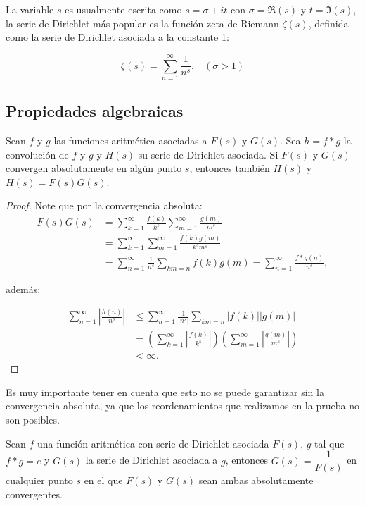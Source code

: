 La variable $s$ es usualmente escrita como $s=\sigma+it$ con $\sigma=\Re(s)$ y $t=\Im(s)$, la serie de Dirichlet más popular es la función zeta de Riemann $\zeta(s)$, definida como la serie de Dirichlet asociada a la constante 1:

$$\zeta(s)=\sum_{n=1}^{\infty} \frac{1}{n^s}.\quad (\sigma>1) $$

\subsection{Propiedades algebraicas}

\begin{theorem}\label{proddirich}
Sean $f$ y $g$ las funciones aritmética asociadas a $F(s)$ y $G(s)$. Sea $h=f*g$ la convolución de $f$ y $g$ y $H(s)$ su serie de Dirichlet asociada. Si $F(s)$ y $G(s)$ convergen absolutamente en algún punto $s$, entonces también $H(s)$ y $H(s)=F(s)G(s)$. 
\end{theorem}

\begin{proof}
Note que por la convergencia absoluta:
$$
\begin{aligned}
F(s) G(s) &=\sum_{k=1}^{\infty} \frac{f(k)}{k^s}\sum_{m=1}^{\infty} \frac{g(m)}{m^s} \\
&=\sum_{k=1}^{\infty} \sum_{m=1}^{\infty} \frac{f(k) g(m)}{k^s m^s} \\
& =\sum_{n=1}^{\infty} \frac{1}{n^s} \sum_{k m=n} f(k) g(m)=\sum_{n=1}^{\infty} \frac{f * g(n)}{n^s},
\end{aligned}
$$

además:

$$
\begin{aligned}
\sum_{n=1}^{\infty}\left|\frac{h(n)}{n^s}\right| & \leq \sum_{n=1}^{\infty} \frac{1}{\left|n^s\right|} \sum_{k m=n}|f(k)||g(m)| \\
& =\left(\sum_{k=1}^{\infty}\left|\frac{f(k)}{k^s}\right|\right)\left(\sum_{m=1}^{\infty}\left|\frac{g(m)}{m^s}\right|\right)\\
&<\infty.
\end{aligned}
$$
\end{proof}

Es muy importante tener en cuenta que esto no se puede garantizar sin la convergencia absoluta, ya que los reordenamientos que realizamos en la prueba no son posibles.

\begin{corollary}

Sean $f$ una función aritmética con serie de Dirichlet asociada $F(s)$, $g$ tal que $f*g=e$ y $G(s)$ la serie de Dirichlet asociada a $g$, entonces $G(s)=\dfrac{1}{F(s)}$ en cualquier punto $s$ en el que $F(s)$ y $G(s)$ sean ambas absolutamente convergentes.

\end{corollary}
\pagebreak


